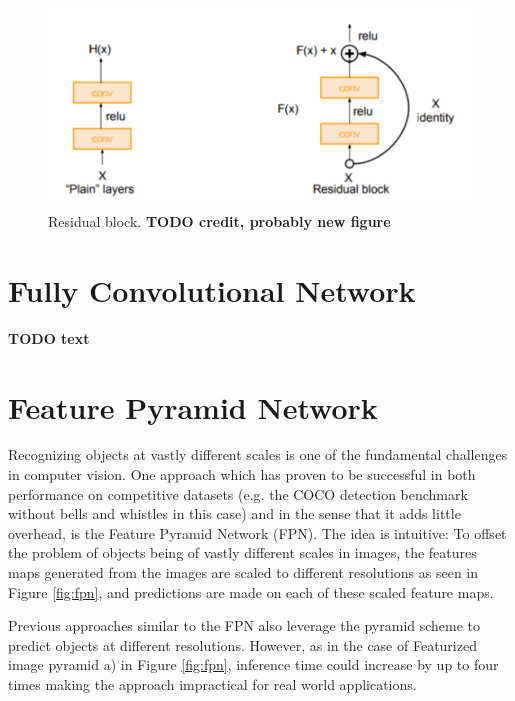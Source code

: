 \documentclass[english, bibtex]{kththesis}
\begin{document}
\begin{figure}[H]
  \begin{center}
    \includegraphics[width=1.0\textwidth]{figures/residual_block.png}
  \end{center}
  \caption{Residual block. \textbf{TODO credit, probably new figure}}
  \label{fig:residual}
\end{figure}



\section{Fully Convolutional Network}

\textbf{TODO text}

\section{Feature Pyramid Network}

Recognizing objects at vastly different scales is one of the fundamental challenges in computer vision. One approach which has proven to be successful in both performance on competitive datasets (e.g. the COCO detection benchmark without bells and whistles in this case) and in the sense that it adds little overhead, is the Feature Pyramid Network (FPN). The idea is intuitive: To offset the problem of objects being of vastly different scales in images, the features maps generated from the images are scaled to different resolutions as seen in Figure \ref{fig:fpn}, and predictions are made on each of these scaled feature maps.

Previous approaches similar to the FPN also leverage the pyramid scheme to predict objects at different resolutions. However, as in the case of Featurized image pyramid a) in Figure \ref{fig:fpn}, inference time could increase by up to four times making the approach impractical for real world applications.
\end{document}
